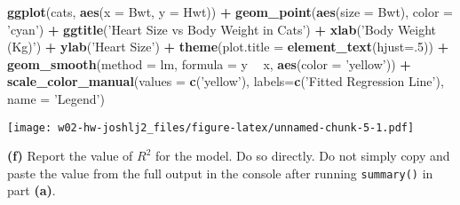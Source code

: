 \documentclass[]{article}
\newenvironment{Shaded}{\begin{snugshade}}{\end{snugshade}}
\newcommand{\KeywordTok}[1]{\textcolor[rgb]{0.13,0.29,0.53}{\textbf{#1}}}
\newcommand{\DataTypeTok}[1]{\textcolor[rgb]{0.13,0.29,0.53}{#1}}
\newcommand{\DecValTok}[1]{\textcolor[rgb]{0.00,0.00,0.81}{#1}}
\newcommand{\StringTok}[1]{\textcolor[rgb]{0.31,0.60,0.02}{#1}}
\newcommand{\CommentTok}[1]{\textcolor[rgb]{0.56,0.35,0.01}{\textit{#1}}}
\newcommand{\OperatorTok}[1]{\textcolor[rgb]{0.81,0.36,0.00}{\textbf{#1}}}
\newcommand{\NormalTok}[1]{#1}
\begin{document}
\begin{Shaded}
\begin{Highlighting}[]
\KeywordTok{ggplot}\NormalTok{(cats, }\KeywordTok{aes}\NormalTok{(}\DataTypeTok{x =}\NormalTok{ Bwt, }\DataTypeTok{y =}\NormalTok{ Hwt)) }\OperatorTok{+}\StringTok{ }\KeywordTok{geom_point}\NormalTok{(}\KeywordTok{aes}\NormalTok{(}\DataTypeTok{size =}\NormalTok{ Bwt), }\DataTypeTok{color =} \StringTok{'cyan'}\NormalTok{) }\OperatorTok{+}\StringTok{ }\KeywordTok{ggtitle}\NormalTok{(}\StringTok{'Heart Size vs Body Weight in Cats'}\NormalTok{) }\OperatorTok{+}\StringTok{ }\KeywordTok{xlab}\NormalTok{(}\StringTok{'Body Weight (Kg)'}\NormalTok{) }\OperatorTok{+}\StringTok{ }\KeywordTok{ylab}\NormalTok{(}\StringTok{'Heart Size'}\NormalTok{) }\OperatorTok{+}\StringTok{ }\KeywordTok{theme}\NormalTok{(}\DataTypeTok{plot.title =} \KeywordTok{element_text}\NormalTok{(}\DataTypeTok{hjust=}\NormalTok{.}\DecValTok{5}\NormalTok{)) }\OperatorTok{+}\StringTok{ }\KeywordTok{geom_smooth}\NormalTok{(}\DataTypeTok{method =}\NormalTok{ lm, }\DataTypeTok{formula =}\NormalTok{ y }\OperatorTok{~}\StringTok{ }\NormalTok{x, }\KeywordTok{aes}\NormalTok{(}\DataTypeTok{color =} \StringTok{'yellow'}\NormalTok{)) }\OperatorTok{+}\StringTok{ }\KeywordTok{scale_color_manual}\NormalTok{(}\DataTypeTok{values =} \KeywordTok{c}\NormalTok{(}\StringTok{'yellow'}\NormalTok{), }\DataTypeTok{labels=}\KeywordTok{c}\NormalTok{(}\StringTok{'Fitted Regression Line'}\NormalTok{), }\DataTypeTok{name =} \StringTok{'Legend'}\NormalTok{)}
\end{Highlighting}
\end{Shaded}

\texttt{[image: w02-hw-joshlj2\_files/figure-latex/unnamed-chunk-5-1.pdf]}

\textbf{(f)} Report the value of \(R^2\) for the model. Do so directly.
Do not simply copy and paste the value from the full output in the
console after running \texttt{summary()} in part \textbf{(a)}.

\begin{Shaded}
\end{Shaded}
\end{document}
